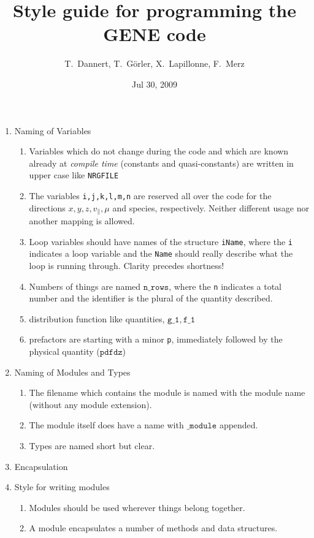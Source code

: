 \documentclass[12pt,a4paper]{article}
\title{Style guide for programming the GENE code}
\author{T.~Dannert, T.~G\"orler, X.~Lapillonne, F.~Merz}
\date{Jul 30, 2009}
\begin{document}
\maketitle

\begin{enumerate}
\item Naming of Variables
  \begin{enumerate}
  \item Variables which do not change during the code and which are known
    already at \textit{compile time} (constants and quasi-constants) are
    written in upper case like \texttt{NRGFILE}
  \item The variables \texttt{i,j,k,l,m,n} are reserved all over the code for
    the directions $x, y, z, v_\|, \mu$ and species, respectively. Neither different usage nor
    another mapping is allowed. 
  \item Loop variables should have names of the structure \texttt{iName},
    where the \texttt{i} indicates a loop variable and the \texttt{Name}
    should really describe what the loop is running through. Clarity precedes
    shortness! 
  \item Numbers of things are named $\mathtt{n\_rows}$, where the \texttt{n}
    indicates a total number and the identifier is the plural of the quantity
    described. 
  \item distribution function like quantities, $\mathtt{g\_1, f\_1}$
  \item prefactors are starting with a minor \texttt{p}, immediately followed
    by the physical quantity ($\mathtt{pdfdz}$)
  \end{enumerate}
\item Naming of Modules and Types
  \begin{enumerate}
  \item The filename which contains the module is named with the module name
    (without any module extension). 
  \item The module itself does have a name with $\mathtt{\_module}$ appended.
  \item Types are named short but clear.
 \end{enumerate}
\item Encapsulation
\item Style for writing modules
  \begin{enumerate}
  \item Modules should be used wherever things belong together.
  \item A module encapsulates a number of methods and data structures. 

\end{enumerate}
\end{enumerate}
\end{document}
